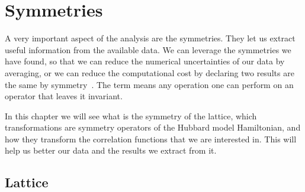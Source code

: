 
\chapter{Symmetries}
\label{sec:symmetries}

A very important aspect of the analysis are the symmetries. They let us extract useful information from the available data. We can leverage the symmetries we have found, so that we can reduce the numerical uncertainties of our data by averaging, or we can reduce the computational cost by declaring two results are the same by symmetry~\cite{evan}. The term means any operation one can perform on an operator that leaves it invariant.

In this chapter we will see what is the symmetry of the lattice, which transformations are symmetry operators of the Hubbard model Hamiltonian, and how they transform the correlation functions that we are interested in. This will help us better our data and the results we extract from it.

\section{Lattice}
\label{sec:lattice}

